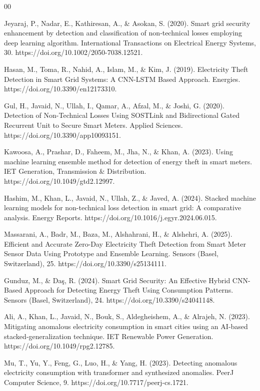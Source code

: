 \documentclass{ieeeaccess}
\begin{document}
\begin{thebibliography}{00}

 Jeyaraj, P., Nadar, E., Kathiresan, A., \& Asokan, S. (2020). Smart grid security enhancement by detection and classification of non‐technical losses employing deep learning algorithm. International Transactions on Electrical Energy Systems, 30. https://doi.org/10.1002/2050-7038.12521.

 Hasan, M., Toma, R., Nahid, A., Islam, M., \& Kim, J. (2019). Electricity Theft Detection in Smart Grid Systems: A CNN-LSTM Based Approach. Energies. https://doi.org/10.3390/en12173310.

 Gul, H., Javaid, N., Ullah, I., Qamar, A., Afzal, M., \& Joshi, G. (2020). Detection of Non-Technical Losses Using SOSTLink and Bidirectional Gated Recurrent Unit to Secure Smart Meters. Applied Sciences. https://doi.org/10.3390/app10093151.

 Kawoosa, A., Prashar, D., Faheem, M., Jha, N., \& Khan, A. (2023). Using machine learning ensemble method for detection of energy theft in smart meters. IET Generation, Transmission \& Distribution. https://doi.org/10.1049/gtd2.12997.

 Hashim, M., Khan, L., Javaid, N., Ullah, Z., \& Javed, A. (2024). Stacked machine learning models for non-technical loss detection in smart grid: A comparative analysis. Energy Reports. https://doi.org/10.1016/j.egyr.2024.06.015.

 Massarani, A., Badr, M., Baza, M., Alshahrani, H., \& Alshehri, A. (2025). Efficient and Accurate Zero-Day Electricity Theft Detection from Smart Meter Sensor Data Using Prototype and Ensemble Learning. Sensors (Basel, Switzerland), 25. https://doi.org/10.3390/s25134111.

 Gunduz, M., \& Daş, R. (2024). Smart Grid Security: An Effective Hybrid CNN-Based Approach for Detecting Energy Theft Using Consumption Patterns. Sensors (Basel, Switzerland), 24. https://doi.org/10.3390/s24041148.

 Ali, A., Khan, L., Javaid, N., Bouk, S., Aldegheishem, A., \& Alrajeh, N. (2023). Mitigating anomalous electricity consumption in smart cities using an AI‐based stacked‐generalization technique. IET Renewable Power Generation. https://doi.org/10.1049/rpg2.12785.

 Mu, T., Yu, Y., Feng, G., Luo, H., \& Yang, H. (2023). Detecting anomalous electricity consumption with transformer and synthesized anomalies. PeerJ Computer Science, 9. https://doi.org/10.7717/peerj-cs.1721.


\end{thebibliography}
\end{document}
